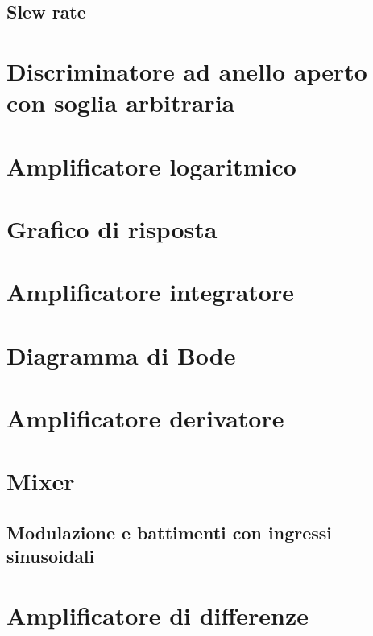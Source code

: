 \documentclass[journal]{IEEEtran}
\begin{document}
\subsection{Slew rate}

\section{Discriminatore ad anello aperto con soglia arbitraria}


\section{Amplificatore logaritmico}

\section{Grafico di risposta}

\section{Amplificatore integratore}

\section{Diagramma di Bode}

\section{Amplificatore derivatore}


\section{Mixer}

\subsection{Modulazione e battimenti con ingressi sinusoidali}

\section{Amplificatore di differenze}
\end{document}
